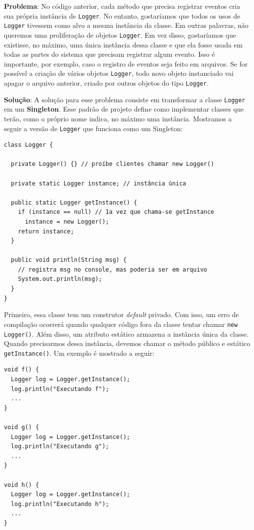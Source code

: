 \documentclass[
  11pt,
  twoside]{book}
\newcommand{\passthrough}[1]{#1}
\begin{document}
\textbf{Problema}: No código anterior, cada método que precisa registrar
eventos cria sua própria instância de \passthrough{\lstinline!Logger!}.
No entanto, gostaríamos que todos os usos de
\passthrough{\lstinline!Logger!} tivessem como alvo a mesma instância da
classe. Em outras palavras, não queremos uma proliferação de objetos
\passthrough{\lstinline!Logger!}. Em vez disso, gostaríamos que
existisse, no máximo, uma única instância dessa classe e que ela fosse
usada em todas as partes do sistema que precisam registrar algum evento.
Isso é importante, por exemplo, caso o registro de eventos seja feito em
arquivos. Se for possível a criação de vários objetos
\passthrough{\lstinline!Logger!}, todo novo objeto instanciado vai
apagar o arquivo anterior, criado por outros objetos do tipo
\passthrough{\lstinline!Logger!}.

\textbf{Solução}: A solução para esse problema consiste em transformar a
classe \passthrough{\lstinline!Logger!} em um \textbf{Singleton}. Esse
padrão de projeto define como implementar classes que terão, como o
próprio nome indica, no máximo uma instância. Mostramos a seguir a
versão de \passthrough{\lstinline!Logger!} que funciona como um
Singleton:

\begin{lstlisting}
class Logger {

  private Logger() {} // proíbe clientes chamar new Logger()

  private static Logger instance; // instância única

  public static Logger getInstance() {
    if (instance == null) // 1a vez que chama-se getInstance
      instance = new Logger();
    return instance;
  }

  public void println(String msg) {
    // registra msg no console, mas poderia ser em arquivo
    System.out.println(msg);      
  }
}
\end{lstlisting}

Primeiro, essa classe tem um construtor \emph{default} privado. Com
isso, um erro de compilação ocorrerá quando qualquer código fora da
classe tentar chamar \passthrough{\lstinline!new Logger()!}. Além disso,
um atributo estático armazena a instância única da classe. Quando
precisarmos dessa instância, devemos chamar o método público e estático
\passthrough{\lstinline!getInstance()!}. Um exemplo é mostrado a seguir:

\begin{lstlisting}
void f() {
  Logger log = Logger.getInstance();  
  log.println("Executando f");
  ...
}

void g() {
  Logger log = Logger.getInstance();  
  log.println("Executando g");
  ...
}

void h() {
  Logger log = Logger.getInstance();  
  log.println("Executando h");
  ...
}
\end{lstlisting}
\end{document}
